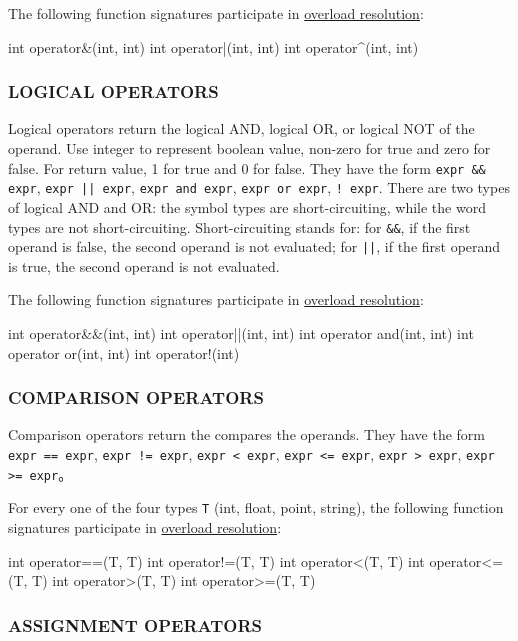 \documentclass{article}
\begin{document}
The following function signatures participate in \hyperref[chongzai]{overload resolution}:
\begin{MUAvbt}
int operator&(int, int)
int operator|(int, int)
int operator^(int, int)
\end{MUAvbt}

\subsubsection{LOGICAL OPERATORS}
\label{luoji}

Logical operators return the logical AND, logical OR, or logical NOT of the operand. Use integer to represent boolean value, non-zero for true and zero for false. For return value, 1 for true and 0 for false. They have the form \verb|expr && expr|, \verb&expr || expr&, \verb|expr and expr|, \verb&expr or expr&, \verb|! expr|. There are two types of logical AND and OR: the symbol types are short-circuiting, while the word types are not short-circuiting. Short-circuiting stands for: for \verb|&&|, if the first operand is false, the second operand is not evaluated; for \verb&||&, if the first operand is true, the second operand is not evaluated.

The following function signatures participate in \hyperref[chongzai]{overload resolution}:
\begin{MUAvbt}
int operator&&(int, int)
int operator||(int, int)
int operator and(int, int)
int operator or(int, int)
int operator!(int)
\end{MUAvbt}

\subsubsection{COMPARISON OPERATORS}
\label{bijiao}

Comparison operators return the compares the operands. They have the form \verb|expr == expr|, \verb|expr != expr|, \verb|expr < expr|, \verb|expr <= expr|, \verb|expr > expr|, \verb|expr >= expr|。

For every one of the four types \verb|T| (int, float, point, string), the following function signatures participate in \hyperref[chongzai]{overload resolution}:
\begin{MUAvbt}
int operator==(T, T)
int operator!=(T, T)
int operator<(T, T)
int operator<=(T, T)
int operator>(T, T)
int operator>=(T, T)
\end{MUAvbt}

\subsubsection{ASSIGNMENT OPERATORS}
\label{fuzhi}
\end{document}
